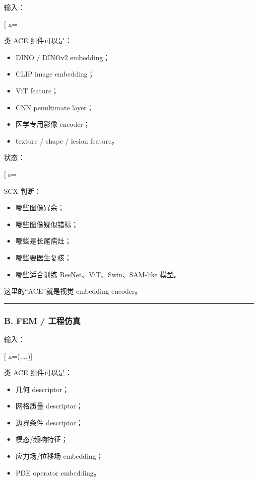 \documentclass[
  12pt,
]{ctexart}
\providecommand{\tightlist}{%
  \setlength{\itemsep}{0pt}\setlength{\parskip}{0pt}}
\begin{document}
输入：

{[} x=\text{image}{]}

类 ACE 组件可以是：

\begin{itemize}
\tightlist
\item
  DINO / DINOv2 embedding；
\item
  CLIP image embedding；
\item
  ViT feature；
\item
  CNN penultimate layer；
\item
  医学专用影像 encoder；
\item
  texture / shape / lesion feature。
\end{itemize}

状态：

{[} s=\text{visual phenotype / disease subtype / image quality state}{]}

SCX 判断：

\begin{itemize}
\tightlist
\item
  哪些图像冗余；
\item
  哪些图像疑似错标；
\item
  哪些是长尾病灶；
\item
  哪些要医生复核；
\item
  哪些适合训练 ResNet、ViT、Swin、SAM-like 模型。
\end{itemize}

这里的``ACE''就是视觉 embedding encoder。

\begin{center}\rule{0.5\linewidth}{0.5pt}\end{center}

\subsubsection{B. FEM / 工程仿真}\label{b.-fem-ux5de5ux7a0bux4effux771f}

输入：

{[} x=(\Omega,,,,\theta){]}

类 ACE 组件可以是：

\begin{itemize}
\tightlist
\item
  几何 descriptor；
\item
  网格质量 descriptor；
\item
  边界条件 descriptor；
\item
  模态/频响特征；
\item
  应力场/位移场 embedding；
\item
  PDE operator embedding。
\end{itemize}
\end{document}
